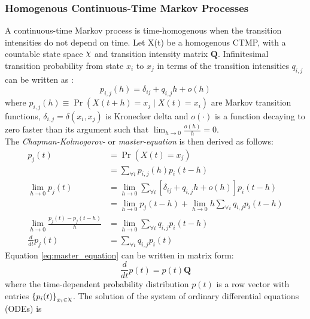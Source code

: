 \subsubsection{Homogenous Continuous-Time Markov Processes}
A continuous-time Markov process is time-homogenous when the transition intensities do not depend on time. Let X(t) be a homogenous CTMP, with a countable state space $ \rchi $ and transition intensity matrix $ \textbf{Q} $. Infinitesimal transition probability from state $ x_{i} $ to $ x_{j} $ in terms of the transition intensities $ q_{i,j} $ can be written as \cite{Cohn2010a}:
\begin{equation}
p_{i,j}(h)=\delta_{ij}+q_{i,j} h+o(h)
\label{eq:Markov_trans_func}
\end{equation}
where $ p_{i, j}(h) \equiv \operatorname{Pr}(X(t+h)=x_j\mid X(t)=x_i) $ are Markov transition functions, $ \delta_{i,j} = \delta(x_i,x_j)$ is Kronecker delta and $ o(\cdot) $ is a function decaying to zero faster than its argument such that $ \lim_{h \to 0} \frac{o(h)}{h} = 0 $.\\
The \textit{Chapman-Kolmogorov-} or \textit{master-equation} is then derived as follows:
\begin{align}
p_{j}(t) &= \operatorname{Pr}(X(t) = x_{j}) \nonumber\\
& =\sum_{\forall i} p_{i, j}(h) p_{i}(t-h) \nonumber \\
\lim_{h\rightarrow 0} p_{j}(t) 
& = \lim_{h\rightarrow 0} \sum_{\forall i} \left[ \delta_{ij}+q_{i,j} h+o(h)\right]  p_{i}(t-h) \nonumber \\ 
& = \lim_{h\rightarrow 0} p_{j}(t-h) + \lim_{h\rightarrow 0} h \sum_{\forall i} q_{i,j} p_{i}(t-h) \nonumber \\
\lim_{h\rightarrow 0} \frac{p_{j}(t) - p_{j}(t-h)}{h} 
&= \lim_{h\rightarrow 0} \sum_{\forall i} q_{i,j} p_{i}(t-h) \nonumber\\
\frac{d}{dt} p_{j}(t) & = \sum_{\forall i} q_{i,j} p_{i}(t)
\label{eq:master_equation}
\end{align}
Equation \ref{eq:master_equation} can be written in matrix form:
\begin{equation}
\frac{d}{dt} p(t) = p(t)\textbf{Q}
\end{equation}
where the time-dependent probability distribution $ p(t) $ is a row vector with entries $ \left\lbrace p_{i}(t)\right\rbrace_{x_{i}\in \rchi} $. The solution of the system of ordinary differential equations (ODEs) is
